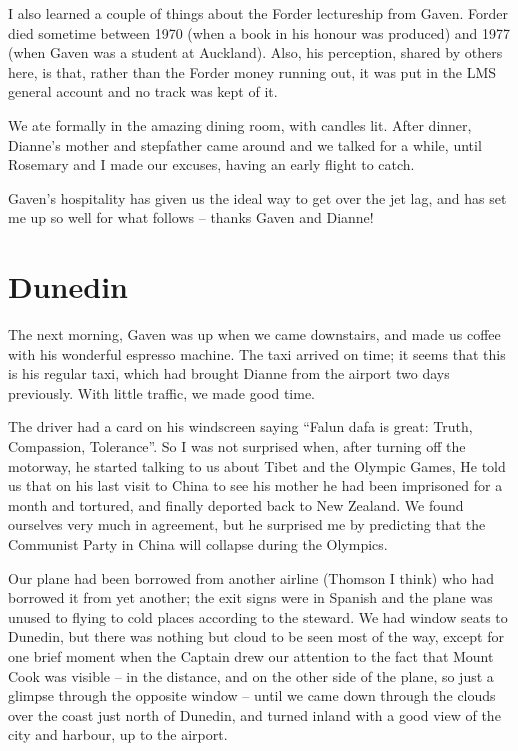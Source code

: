 \documentclass[12pt,a4paper]{article}
\begin{document}
I also learned a couple of things about the Forder lectureship from Gaven.
Forder died sometime between 1970 (when a book in his honour was produced)
and 1977 (when Gaven was a student at Auckland). Also, his perception,
shared by others here, is that, rather than the Forder money running out,
it was put in the LMS general account and no track was kept of it.

We ate formally in the amazing dining room, with 
candles lit. After dinner, Dianne's mother and stepfather came around
and we talked for a while, until Rosemary and I made our excuses, having 
an early flight to catch.

Gaven's hospitality has given us the ideal way to get over the jet lag,
and has set me up so well for what follows -- thanks Gaven and Dianne!

\section{Dunedin}

The next morning, Gaven was up when we came downstairs, and made us coffee
with his wonderful espresso machine. The taxi arrived on time; it seems
that this is his regular taxi, which had brought Dianne from the airport
two days previously. With little traffic, we made good time.

The driver had a card on his windscreen saying ``Falun dafa is great: Truth,
Compassion, Tolerance''. So I was not surprised when, after turning off the
motorway, he started talking to us about Tibet and the Olympic Games,
He told us that on his last visit to China to see his mother he had
been imprisoned for a month and tortured, and finally deported back to 
New Zealand. We found ourselves very much in agreement, but he surprised
me by predicting that the Communist Party in China will collapse during
the Olympics.

Our plane had been borrowed from another airline (Thomson I think) who
had borrowed it from yet another; the exit signs were in Spanish and
the plane was unused to flying to cold places according to the steward.
We had window seats to Dunedin, but there was nothing but cloud to be seen
most of the way, except for one brief moment when the Captain drew our
attention to the fact that Mount Cook was visible -- in the distance, and
on the other side of the plane, so just a glimpse through the opposite
window -- until we came down through the clouds over the coast just north
of Dunedin, and turned inland with a good view of the city and harbour,
up to the airport.
\end{document}
